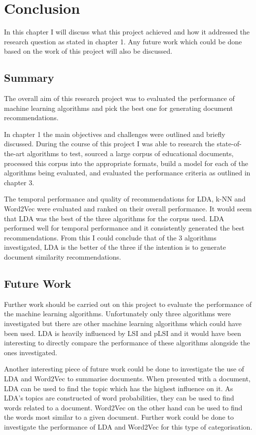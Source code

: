 \chapter{Conclusion}
In this chapter I will discuss what this project achieved and how it addressed the research question as stated in chapter 1.
Any future work which could be done based on the work of this project will also be discussed.

\section{Summary}
The overall aim of this research project was to evaluated the performance of machine learning algorithms and pick the best one for generating document recommendations.

In chapter 1 the main objectives and challenges were outlined and briefly discussed.
During the course of this project I was able to research the state-of-the-art algorithms to test, sourced a large corpus of educational documents, processed this corpus into the appropriate formats, build a model for each of the algorithms being evaluated, and evaluated the performance criteria as outlined in chapter 3.

The temporal performance and quality of recommendations for LDA, k-NN and Word2Vec were evaluated and ranked on their overall performance.
It would seem that LDA was the best of the three algorithms for the corpus used.
LDA performed well for temporal performance and it consistently generated the best recommendations.
From this I could conclude that of the 3 algorithms investigated, LDA is the better of the three if the intention is to generate document similarity recommendations.

\section{Future Work}
Further work should be carried out on this project to evaluate the performance of the machine learning algorithms.
Unfortunately only three algorithms were investigated but there are other machine learning algorithms which could have been used.
LDA is heavily influenced by LSI and pLSI and it would have been interesting to directly compare the performance of these algorithms alongside the ones investigated.

Another interesting piece of future work could be done to investigate the use of LDA and Word2Vec to summarise documents.
When presented with a document, LDA can be used to find the topic which has the highest influence on it.
As LDA's topics are constructed of word probabilities, they can be used to find words related to a document.
Word2Vec on the other hand can be used to find the words most similar to a given document.
Further work could be done to investigate the performance of LDA and Word2Vec for this type of categorisation.

